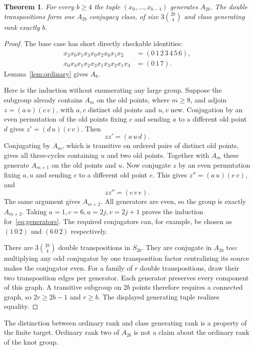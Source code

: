 \documentclass[11pt]{article}
\newtheorem{theorem}{Theorem}
\begin{document}
\begin{theorem}\label{thm:targets}
For every $b\ge4$ the tuple $(x_0,\ldots,x_{b-1})$ generates $A_{2b}$.
The double transpositions form one $A_{2b}$ conjugacy class, of size
$3\binom{2b}{4}$ and class generating rank exactly $b$.
\end{theorem}
\begin{proof}
The base case has short directly checkable identities:
\begin{align*}
 x_3x_0x_1x_3x_0x_2x_0x_1x_2&=(0\,1\,2\,3\,4\,5\,6),\\
 x_0x_3x_1x_2x_3x_1x_3x_2x_1x_3&=(0\,1\,7).
\end{align*}
Lemma~\ref{lem:ordinary} gives $A_8$.

Here is the induction without enumerating any large group. Suppose the
subgroup already contains $A_m$ on the old points, where $m\ge8$, and
adjoin $z=(a\,u)(c\,v)$, with $a,c$ distinct old points and $u,v$ new.
Conjugation by an even permutation of the old points fixing $c$ and
sending $a$ to a different old point $d$ gives
$z'=(d\,u)(c\,v)$. Then
\[
                         zz'=(a\,u\,d).
\]
Conjugating by $A_m$, which is transitive on ordered pairs of distinct
old points, gives all three-cycles containing $u$ and two old points.
Together with $A_m$ these generate $A_{m+1}$ on the old points and $u$.
Now conjugate $z$ by an even permutation fixing $a,u$ and sending $c$
to a different old point $e$. This gives $z''=(a\,u)(e\,v)$, and
\[
                         zz''=(c\,v\,e).
\]
The same argument gives $A_{m+2}$. All generators are even, so the group
is exactly $A_{m+2}$. Taking $a=1,c=6,u=2j,v=2j+1$ proves the induction
for~\eqref{eq:generators}. The required conjugators can, for example, be
chosen as $(1\,0\,2)$ and $(6\,0\,2)$ respectively.

There are $3\binom{2b}{4}$ double transpositions in $S_{2b}$. They are
conjugate in $A_{2b}$ too: multiplying any odd conjugator by one
transposition factor centralizing its source makes the conjugator even.
For a family of $r$ double transpositions, draw their two transposition
edges per generator. Each generator preserves every component of this
graph. A transitive subgroup on $2b$ points therefore requires a
connected graph, so $2r\ge2b-1$ and $r\ge b$. The displayed generating
tuple realizes equality.
\end{proof}

The distinction between ordinary rank and class generating rank is a
property of the finite target. Ordinary rank two of $A_{2b}$ is not a
claim about the ordinary rank of the knot group.
\end{document}

